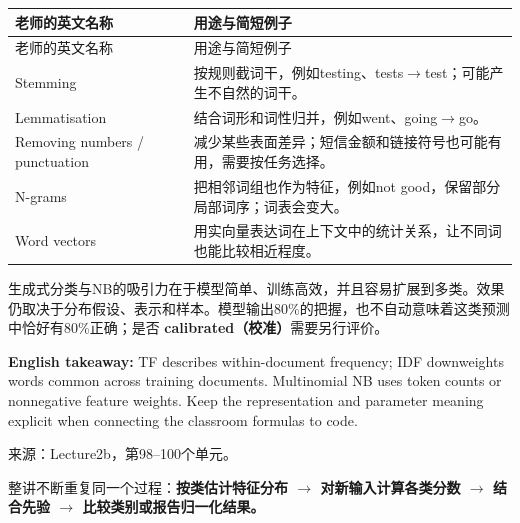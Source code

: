\begingroup
\small\setlength{\tabcolsep}{3pt}
\renewcommand{\arraystretch}{1.22}
\begin{longtable}{@{}>{\raggedright\arraybackslash}p{}>{\raggedright\arraybackslash}p{}@{}}
\toprule
老师的英文名称 & 用途与简短例子 \\
\midrule\endfirsthead
老师的英文名称 & 用途与简短例子 \\
\midrule\endhead
\bottomrule\endfoot
Stemming & 按规则截词干，例如testing、tests\ensuremath{\to}test；可能产生不自然的词干。 \\
Lemmatisation & 结合词形和词性归并，例如went、going\ensuremath{\to}go。 \\
Removing numbers / punctuation & 减少某些表面差异；短信金额和链接符号也可能有用，需要按任务选择。 \\
N-grams & 把相邻词组也作为特征，例如not good，保留部分局部词序；词表会变大。 \\
Word vectors & 用实向量表达词在上下文中的统计关系，让不同词也能比较相近程度。 \\
\end{longtable}
\endgroup


生成式分类与NB的吸引力在于模型简单、训练高效，并且容易扩展到多类。效果仍取决于分布假设、表示和样本。模型输出80\%的把握，也不自动意味着这类预测中恰好有80\%正确；是否 \textbf{calibrated（校准）}需要另行评价。


\textbf{English takeaway:} TF describes within-document frequency; IDF downweights words common across training documents. Multinomial NB uses token counts or nonnegative feature weights. Keep the representation and parameter meaning explicit when connecting the classroom formulas to code.


来源：Lecture2b，第98–100个单元。








整讲不断重复同一个过程：\textbf{按类估计特征分布 \ensuremath{\to} 对新输入计算各类分数 \ensuremath{\to} 结合先验 \ensuremath{\to} 比较类别或报告归一化结果。}


